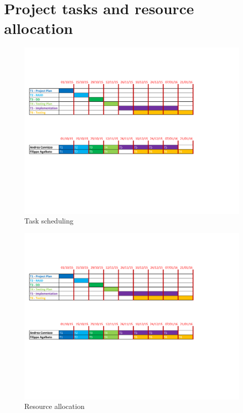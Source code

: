 \chapter{Project tasks and resource allocation}

\begin{figure}
\centering
\includegraphics[width=\textwidth]{tex-images/TaskSchedule}
\caption{Task scheduling}
\end{figure}

\begin{figure}
\centering
\includegraphics[width=\textwidth]{tex-images/ResourceAllocation}
\caption{Resource allocation}
\end{figure}

